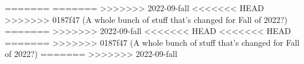 \documentclass{../../oss-apphys-exam}
\begin{document}
\begin{multicols*}{2}
\begin{questions}
=======
=======
>>>>>>> 2022-09-fall
%  
%    
<<<<<<< HEAD
>>>>>>> 0187f47 (A whole bunch of stuff that's changed for Fall of 2022?)
=======
>>>>>>> 2022-09-fall
<<<<<<< HEAD
<<<<<<< HEAD
=======
>>>>>>> 0187f47 (A whole bunch of stuff that's changed for Fall of 2022?)
=======
>>>>>>> 2022-09-fall


\end{questions}
\end{multicols*}
\end{document}
